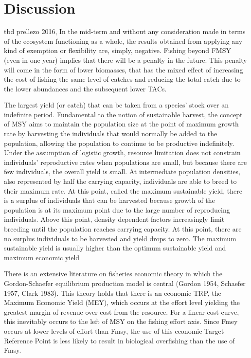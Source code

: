 \documentclass[12pt,oneline,a4paper,numbib]{ouparticle}
\numberwithin{equation}{subsection} %
\begin{document}
\newpage
\section{Discussion}
\label{sec4}
tbd
prellezo 2016, In the mid-term and without any consideration made in terms of the ecosystem functioning as a whole, the results obtained from applying any kind of exemption or flexibility are, simply, negative. Fishing beyond FMSY (even in one year) implies that there will be a penalty in the future. This penalty will come in the form of lower biomasses, that has the mixed effect of increasing the cost of fishing the same level of catches and reducing the total catch due to the lower abundances and the subsequent lower TACs.

The largest yield (or catch) that can be taken from a species' stock over an indefinite period. Fundamental to the notion of sustainable harvest, the concept of MSY aims to maintain the population size at the point of maximum growth rate by harvesting the individuals that would normally be added to the population, allowing the population to continue to be productive indefinitely. Under the assumption of logistic growth, resource limitation does not constrain individuals’ reproductive rates when populations are small, but because there are few individuals, the overall yield is small. At intermediate population densities, also represented by half the carrying capacity, individuals are able to breed to their maximum rate. At this point, called the maximum sustainable yield, there is a surplus of individuals that can be harvested because growth of the population is at its maximum point due to the large number of reproducing individuals. Above this point, density dependent factors increasingly limit breeding until the population reaches carrying capacity. At this point, there are no surplus individuals to be harvested and yield drops to zero. The maximum sustainable yield is usually higher than the optimum sustainable yield and maximum economic yield

There is an extensive literature on fisheries economic theory in which the Gordon-Schaefer equilibrium production model is central (Gordon 1954, Schaefer 1957, Clark 1983). This theory holds that there is an economic TRP, the Maximum Economic Yield (MEY), which occurs at the effort level yielding the greatest margin of revenue over cost from the resource. 
For a linear cost curve, this inevitably occurs to the left of MSY on the fishing effort axis. Since Fmey occurs at lower levels of effort than Fmsy, the use of this economic Target Reference Point is less likely to result in biological overfishing than the use of Fmsy.
\end{document}
